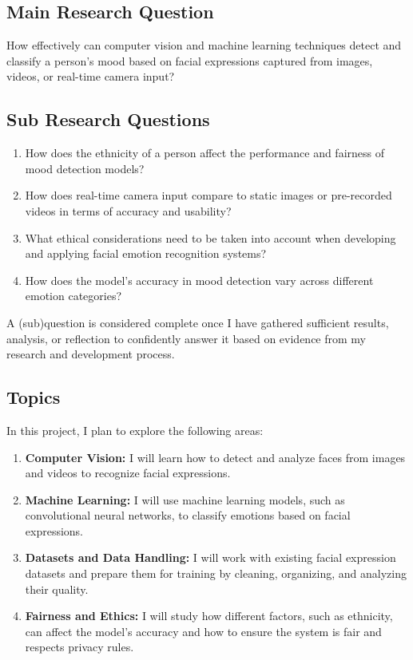 \documentclass[12pt,a4paper]{article}
\begin{document}
\subsection{Main Research Question}
How effectively can computer vision and machine learning techniques detect and classify a person’s mood based on facial expressions captured from images, videos, or real-time camera input?

\subsection{Sub Research Questions}

\begin{enumerate}
    \item How does the ethnicity of a person affect the performance and fairness of mood detection models?
    \item How does real-time camera input compare to static images or pre-recorded videos in terms of accuracy and usability?
    \item What ethical considerations need to be taken into account when developing and applying facial emotion recognition systems?
   \item How does the model’s accuracy in mood detection vary across different emotion categories?
\end{enumerate}
A (sub)question is considered complete once I have gathered sufficient results, analysis, or reflection to confidently answer it based on evidence from my research and development process.


\subsection{Topics}
In this project, I plan to explore the following areas:
\begin{enumerate}
\item \textbf{Computer Vision:} I will learn how to detect and analyze faces from images and videos to recognize facial expressions.

    \item \textbf{Machine Learning:} I will use machine learning models, such as convolutional neural networks, to classify emotions based on facial expressions.

    \item \textbf{Datasets and Data Handling:} I will work with existing facial expression datasets and prepare them for training by cleaning, organizing, and analyzing their quality.

    \item \textbf{Fairness and Ethics:} I will study how different factors, such as ethnicity, can affect the model’s accuracy and how to ensure the system is fair and respects privacy rules.
\end{enumerate}
\end{document}
